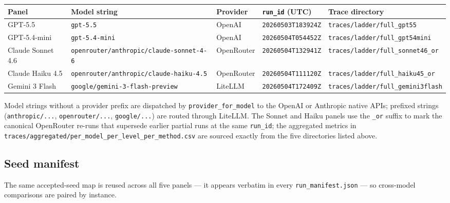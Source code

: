 \begin{center}
\scriptsize
\setlength{\tabcolsep}{4.0pt}
\begin{tabular}{@{}l l l l l@{}}
\toprule
Panel & Model string & Provider & \texttt{run\_id} (UTC) & Trace directory \\
\midrule
GPT-5.5            & \texttt{gpt-5.5}                                 & OpenAI       & \texttt{20260503T183924Z} & \texttt{traces/ladder/full\_gpt55} \\
GPT-5.4-mini       & \texttt{gpt-5.4-mini}                            & OpenAI       & \texttt{20260504T054452Z} & \texttt{traces/ladder/full\_gpt54mini} \\
Claude Sonnet 4.6  & \texttt{openrouter/anthropic/claude-sonnet-4-6}  & OpenRouter   & \texttt{20260504T132941Z} & \texttt{traces/ladder/full\_sonnet46\_or} \\
Claude Haiku 4.5   & \texttt{openrouter/anthropic/claude-haiku-4.5}   & OpenRouter   & \texttt{20260504T111120Z} & \texttt{traces/ladder/full\_haiku45\_or} \\
Gemini 3 Flash     & \texttt{google/gemini-3-flash-preview}           & LiteLLM      & \texttt{20260504T172409Z} & \texttt{traces/ladder/full\_gemini3flash} \\
\bottomrule
\end{tabular}
\end{center}

Model strings without a provider prefix are dispatched by \texttt{provider\_for\_model} to the OpenAI or Anthropic native APIs; prefixed strings (\texttt{anthropic/...}, \texttt{openrouter/...}, \texttt{google/...}) are routed through LiteLLM. The Sonnet and Haiku panels use the \texttt{\_or} suffix to mark the canonical OpenRouter re-runs that supersede earlier partial runs at the same \texttt{run\_id}; the aggregated metrics in \texttt{traces/aggregated/per\_model\_per\_level\_per\_method.csv} are sourced exactly from the five directories listed above.

\subsection{Seed manifest}
\label{app:repro:seeds}

The same accepted-seed map is reused across all five panels --- it appears verbatim in every \texttt{run\_manifest.json} --- so cross-model comparisons are paired by instance.

